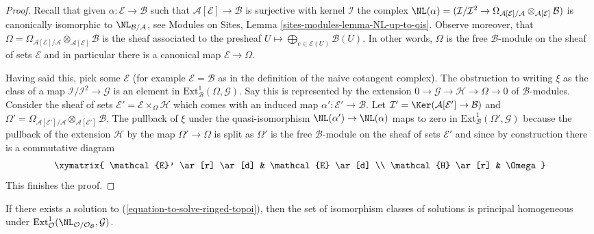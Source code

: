 \begin{proof}
Recall that given $\alpha : \mathcal{E} \to \mathcal{B}$
such that $\mathcal{A}[\mathcal{E}] \to \mathcal{B}$ is surjective
with kernel $\mathcal{I}$ the complex
$\NL(\alpha) = (\mathcal{I}/\mathcal{I}^2 \to 
\Omega_{\mathcal{A}[\mathcal{E}]/\mathcal{A}}
\otimes_{\mathcal{A}[\mathcal{E}]} \mathcal{B})$ is canonically
isomorphic to $\NL_{\mathcal{B}/\mathcal{A}}$, see
Modules on Sites, Lemma \ref{sites-modules-lemma-NL-up-to-qis}.
Observe moreover, that
$\Omega = \Omega_{\mathcal{A}[\mathcal{E}]/\mathcal{A}}
\otimes_{\mathcal{A}[\mathcal{E}]} \mathcal{B}$ is the sheaf
associated to the presheaf
$U \mapsto \bigoplus_{e \in \mathcal{E}(U)} \mathcal{B}(U)$.
In other words, $\Omega$ is the free $\mathcal{B}$-module on the
sheaf of sets $\mathcal{E}$ and in particular there is a canonical
map $\mathcal{E} \to \Omega$.

\medskip\noindent
Having said this, pick some $\mathcal{E}$ (for example
$\mathcal{E} = \mathcal{B}$ as in the definition of the naive cotangent
complex). The obstruction to writing $\xi$ as the class of a map
$\mathcal{I}/\mathcal{I}^2 \to \mathcal{G}$ is an element in
$\text{Ext}^1_\mathcal{B}(\Omega, \mathcal{G})$. Say this is represented
by the extension $0 \to \mathcal{G} \to \mathcal{H} \to \Omega \to 0$
of $\mathcal{B}$-modules. Consider the sheaf of sets
$\mathcal{E}' = \mathcal{E} \times_\Omega \mathcal{H}$
which comes with an induced map $\alpha' : \mathcal{E}' \to \mathcal{B}$.
Let $\mathcal{I}' = \Ker(\mathcal{A}[\mathcal{E}'] \to \mathcal{B})$
and $\Omega' = \Omega_{\mathcal{A}[\mathcal{E}']/\mathcal{A}}
\otimes_{\mathcal{A}[\mathcal{E}']} \mathcal{B}$.
The pullback of $\xi$ under the quasi-isomorphism
$\NL(\alpha') \to \NL(\alpha)$ maps to zero in
$\text{Ext}^1_\mathcal{B}(\Omega', \mathcal{G})$
because the pullback of the extension $\mathcal{H}$
by the map $\Omega' \to \Omega$ is split as $\Omega'$ is the free
$\mathcal{B}$-module on the sheaf of sets $\mathcal{E}'$ and since
by construction there is a commutative diagram
$$
\xymatrix{
\mathcal{E}' \ar[r] \ar[d] & \mathcal{E} \ar[d] \\
\mathcal{H} \ar[r] & \Omega
}
$$
This finishes the proof.
\end{proof}

\begin{lemma}
\label{lemma-choices-ringed-topoi}
If there exists a solution to (\ref{equation-to-solve-ringed-topoi}),
then the set of isomorphism classes of solutions is principal homogeneous
under $\text{Ext}^1_\mathcal{O}(
\NL_{\mathcal{O}/\mathcal{O}_\mathcal{B}}, \mathcal{G})$.
\end{lemma}

